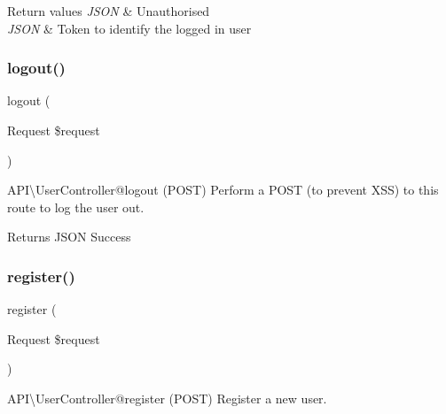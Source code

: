 \begin{DoxyRetVals}{Return values}
{\em J\+S\+ON} & Unauthorised \\
\hline
{\em J\+S\+ON} & Token to identify the logged in user \\
\hline
\end{DoxyRetVals}
\mbox{\label{class_app_1_1_http_1_1_controllers_1_1_a_p_i_1_1_user_controller_a5b2715b64f1825c3c1e3a92ee2b695fc}} 
\subsubsection{\texorpdfstring{logout()}{logout()}}
{\footnotesize\ttfamily logout (\begin{DoxyParamCaption}\item[{Request}]{\$request }\end{DoxyParamCaption})}

\begin{DoxyParagraph}{A\+PI\textbackslash{}\+User\+Controller@logout (P\+O\+ST)}
Perform a P\+O\+ST (to prevent X\+SS) to this route to log the user out.
\end{DoxyParagraph}
\begin{DoxyReturn}{Returns}
J\+S\+ON Success 
\end{DoxyReturn}
\mbox{\label{class_app_1_1_http_1_1_controllers_1_1_a_p_i_1_1_user_controller_ad354167fc268b59819f72a28e6be0987}} 
\subsubsection{\texorpdfstring{register()}{register()}}
{\footnotesize\ttfamily register (\begin{DoxyParamCaption}\item[{Request}]{\$request }\end{DoxyParamCaption})}

\begin{DoxyParagraph}{A\+PI\textbackslash{}\+User\+Controller@register (P\+O\+ST)}
Register a new user.
\end{DoxyParagraph}

